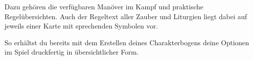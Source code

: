 Dazu gehören die verfügbaren Manöver im Kampf und praktische Regelübersichten.
Auch der Regeltext aller Zauber und Liturgien liegt dabei auf jeweils einer Karte mit sprechenden Symbolen vor.

So erhältst du bereits mit dem Erstellen deines Charakterbogens deine Optionen im Spiel druckfertig in übersichtlicher Form.



%
%	
%	
%	



%	
%
%
\spaltenende